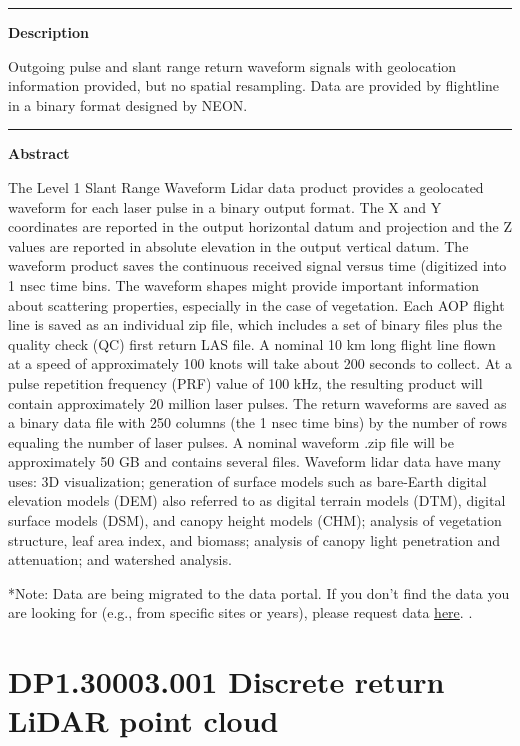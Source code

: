\documentclass[]{article}
\begin{document}
\begin{center}\rule{0.5\linewidth}{\linethickness}\end{center}

\textbf{Description}

Outgoing pulse and slant range return waveform signals with geolocation
information provided, but no spatial resampling. Data are provided by
flightline in a binary format designed by NEON.

\begin{center}\rule{0.5\linewidth}{\linethickness}\end{center}

\textbf{Abstract}

The Level 1 Slant Range Waveform Lidar data product provides a
geolocated waveform for each laser pulse in a binary output format. The
X and Y coordinates are reported in the output horizontal datum and
projection and the Z values are reported in absolute elevation in the
output vertical datum. The waveform product saves the continuous
received signal versus time (digitized into 1 nsec time bins. The
waveform shapes might provide important information about scattering
properties, especially in the case of vegetation. Each AOP flight line
is saved as an individual zip file, which includes a set of binary files
plus the quality check (QC) first return LAS file. A nominal 10 km long
flight line flown at a speed of approximately 100 knots will take about
200 seconds to collect. At a pulse repetition frequency (PRF) value of
100 kHz, the resulting product will contain approximately 20 million
laser pulses. The return waveforms are saved as a binary data file with
250 columns (the 1 nsec time bins) by the number of rows equaling the
number of laser pulses. A nominal waveform .zip file will be
approximately 50 GB and contains several files. Waveform lidar data have
many uses: 3D visualization; generation of surface models such as
bare-Earth digital elevation models (DEM) also referred to as digital
terrain models (DTM), digital surface models (DSM), and canopy height
models (CHM); analysis of vegetation structure, leaf area index, and
biomass; analysis of canopy light penetration and attenuation; and
watershed analysis.

*Note: Data are being migrated to the data portal. If you don't find the
data you are looking for (e.g., from specific sites or years), please
request data
\href{http://www.neonscience.org/request-airborne-data}{here}. \newpage
.

\section{DP1.30003.001 Discrete return LiDAR point
cloud}\label{dp1.30003.001-discrete-return-lidar-point-cloud}
\end{document}
